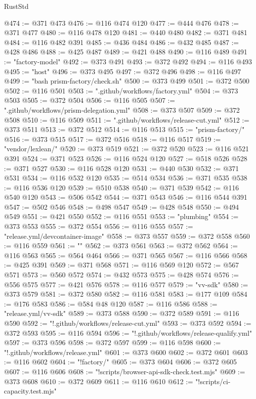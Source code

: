 \begin{lexlean}{RustStd}
\begin{coremodule}
@474 := @371 @473
@476 := @116 @474 @120
@477 := @444 @476
@478 := @371 @477
@480 := @116 @478 @120
@481 := @440 @480
@482 := @371 @481
@484 := @116 @482 @391
@485 := @436 @484
@486 := @432 @485
@487 := @428 @486
@488 := @425 @487
@489 := @421 @488
@490 := @116 @489
@491 := "factory-model"
@492 := @373 @491
@493 := @372 @492
@494 := @116 @493
@495 := "host"
@496 := @373 @495
@497 := @372 @496
@498 := @116 @497
@499 := "bash prism-factory/check.sh"
@500 := @373 @499
@501 := @372 @500
@502 := @116 @501
@503 := ".github/workflows/factory.yml"
@504 := @373 @503
@505 := @372 @504
@506 := @116 @505
@507 := ".github/workflows/prism-delegation.yml"
@508 := @373 @507
@509 := @372 @508
@510 := @116 @509
@511 := ".github/workflows/release-cut.yml"
@512 := @373 @511
@513 := @372 @512
@514 := @116 @513
@515 := "prism-factory/"
@516 := @373 @515
@517 := @372 @516
@518 := @116 @517
@519 := "vendor/lexlean/"
@520 := @373 @519
@521 := @372 @520
@523 := @116 @521 @391
@524 := @371 @523
@526 := @116 @524 @120
@527 := @518 @526
@528 := @371 @527
@530 := @116 @528 @120
@531 := @440 @530
@532 := @371 @531
@534 := @116 @532 @120
@535 := @514 @534
@536 := @371 @535
@538 := @116 @536 @120
@539 := @510 @538
@540 := @371 @539
@542 := @116 @540 @120
@543 := @506 @542
@544 := @371 @543
@546 := @116 @544 @391
@547 := @502 @546
@548 := @498 @547
@549 := @428 @548
@550 := @494 @549
@551 := @421 @550
@552 := @116 @551
@553 := "plumbing"
@554 := @373 @553
@555 := @372 @554
@556 := @116 @555
@557 := "release.yml/devcontainer-image"
@558 := @373 @557
@559 := @372 @558
@560 := @116 @559
@561 := ""
@562 := @373 @561
@563 := @372 @562
@564 := @116 @563
@565 := @564 @464
@566 := @371 @565
@567 := @116 @566
@568 := @425 @391
@569 := @371 @568
@571 := @116 @569 @120
@572 := @567 @571
@573 := @560 @572
@574 := @432 @573
@575 := @428 @574
@576 := @556 @575
@577 := @421 @576
@578 := @116 @577
@579 := "vv-sdk"
@580 := @373 @579
@581 := @372 @580
@582 := @116 @581
@583 := @177 @109
@584 := @176 @583
@586 := @584 @48 @120
@587 := @116 @586
@588 := "release.yml/vv-sdk"
@589 := @373 @588
@590 := @372 @589
@591 := @116 @590
@592 := "!.github/workflows/release-cut.yml"
@593 := @373 @592
@594 := @372 @593
@595 := @116 @594
@596 := "!.github/workflows/release-qualify.yml"
@597 := @373 @596
@598 := @372 @597
@599 := @116 @598
@600 := "!.github/workflows/release.yml"
@601 := @373 @600
@602 := @372 @601
@603 := @116 @602
@604 := "!factory/"
@605 := @373 @604
@606 := @372 @605
@607 := @116 @606
@608 := "!scripts/browser-api-sdk-check.test.mjs"
@609 := @373 @608
@610 := @372 @609
@611 := @116 @610
@612 := "!scripts/ci-capacity.test.mjs"

\end{coremodule}
\end{lexlean}
